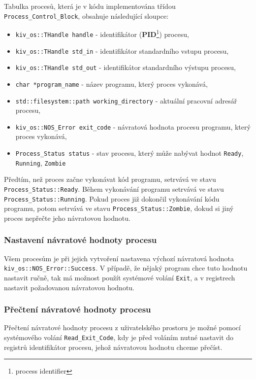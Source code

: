 \documentclass[12pt, a4paper]{article}
\begin{document}
Tabulka procesů, která je v kódu implementována třídou\\ \texttt{Process\_Control\_Block}, obsahuje následující sloupce:
\begin{itemize}
    \item \texttt{kiv\_os::THandle handle} - identifikátor (\textbf{PID}\footnote{process identifier}) procesu,
    \item \texttt{kiv\_os::THandle std\_in} - identifikátor standardního vstupu procesu,
    \item \texttt{kiv\_os::THandle std\_out} - identifikátor standardního výstupu procesu,
    \item \texttt{char *program\_name} - název programu, který proces vykonává,
    \item \texttt{std::filesystem::path working\_directory} - aktuální pracovní adresář procesu,
    \item \texttt{kiv\_os::NOS\_Error exit\_code} - návratová hodnota procesu programu, který proces vykonává,
    \item \texttt{Process\_Status status} - stav procesu, který může nabývat hodnot \texttt{Ready}, \texttt{Running}, \texttt{Zombie}
\end{itemize}

Předtím, než proces začne vykonávat kód programu, setrvává ve stavu \texttt{Process\_Status::Ready}. Během vykonávání programu setrvává ve stavu \texttt{Process\_Status::Running}. Pokud proces již dokončil vykonávání kódu programu, potom setrvává ve stavu \texttt{Process\_Status::Zombie}, dokud si jiný proces nepřečte jeho návratovou hodnotu. 

\subsubsection{Nastavení návratové hodnoty procesu}
Všem procesům je při jejich vytvoření nastavena výchozí návratová hodnota \texttt{kiv\_os::NOS\_Error::Success}. V případě, že nějaký program chce tuto hodnotu nastavit ručně, tak má možnost použít systémové volání \texttt{Exit}, a v registrech nastavit požadovanou návratovou hodnotu.

\subsubsection{Přečtení návratové hodnoty procesu}
Přečtení návratové hodnoty procesu z uživatelského prostoru je možné pomocí systémového volání \texttt{Read\_Exit\_Code}, kdy je před voláním nutné nastavit do registrů identifikátor procesu, jehož návratovou hodnotu chceme přečíst.
\end{document}

